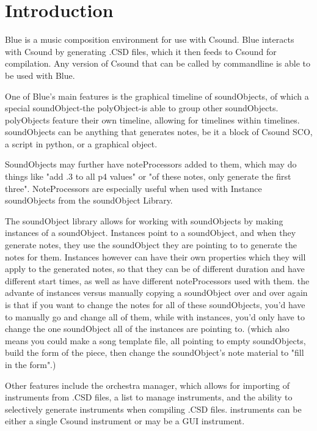 \section{Introduction}\label{userIntro}

Blue is a music composition environment for use with Csound. Blue
interacts with Csound by generating .CSD files, which it then feeds to
Csound for compilation. Any version of Csound that can be called by
commandline is able to be used with Blue.

One of Blue's main features is the graphical timeline of soundObjects,
of which a special soundObject-the polyObject-is able to group other
soundObjects. polyObjects feature their own timeline, allowing for
timelines within timelines. soundObjects can be anything that generates
notes, be it a block of Csound SCO, a script in python, or a graphical
object.

SoundObjects may further have noteProcessors added to them, which may do
things like "add .3 to all p4 values" or "of these notes, only generate
the first three". NoteProcessors are especially useful when used with
Instance soundObjects from the soundObject Library.

The soundObject library allows for working with soundObjects by making
instances of a soundObject. Instances point to a soundObject, and when
they generate notes, they use the soundObject they are pointing to to
generate the notes for them. Instances however can have their own
properties which they will apply to the generated notes, so that they
can be of different duration and have different start times, as well as
have different noteProcessors used with them. the advante of instances
versus manually copying a soundObject over and over again is that if you
want to change the notes for all of these soundObjects, you'd have to
manually go and change all of them, while with instances, you'd only
have to change the one soundObject all of the instances are pointing to.
(which also means you could make a song template file, all pointing to
empty soundObjects, build the form of the piece, then change the
soundObject's note material to "fill in the form".)

Other features include the orchestra manager, which allows for importing
of instruments from .CSD files, a list to manage instruments, and the
ability to selectively generate instruments when compiling .CSD files.
instruments can be either a single Csound instrument or may be a GUI
instrument.
